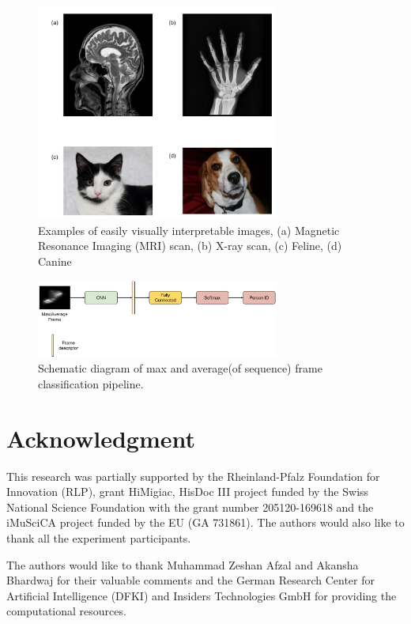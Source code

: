 \documentclass[conference]{IEEEtran}
\begin{document}

\begin{figure}
	\centering
	\includegraphics[width=8cm]{./figures/imagenet.pdf}
	\caption{Examples of easily visually interpretable images, (a) Magnetic Resonance Imaging (MRI) scan, (b) X-ray scan, (c) Feline, (d) Canine }
	\label{fig:imagenet}
\end{figure}


\begin{figure}
	\centering
		\includegraphics[width=8cm]{./figures/max_avg_frame.pdf}
	\caption{Schematic diagram of max and average(of sequence) frame classification pipeline.}
	\label{fig:ann_pipeline}
\end{figure}

















\section*{Acknowledgment}

This research was partially supported by the Rheinland-Pfalz Foundation for Innovation (RLP), grant HiMigiac, HisDoc III project funded by the Swiss National Science Foundation with the grant number 205120-169618 and the iMuSciCA project funded by the EU (GA 731861). The authors would also like to thank all the experiment participants.
\par
The authors would like to thank Muhammad Zeshan Afzal and Akansha Bhardwaj for their valuable comments and the German Research Center for Artificial Intelligence (DFKI) and Insiders Technologies GmbH for providing the computational resources.
\end{document}
